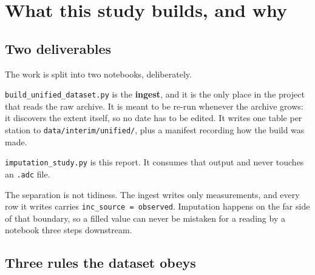 \documentclass[11pt,a4paper]{article}
\begin{document}
\tableofcontents

\section{What this study builds, and why}
\label{sec:intro}

\subsection{Two deliverables}

The work is split into two notebooks, deliberately.

\texttt{build\_unified\_dataset.py} is the \textbf{ingest}, and it is the only place
in the project that reads the raw archive. It is meant to be re-run whenever the
archive grows: it discovers the extent itself, so no date has to be edited. It
writes one table per station to \texttt{data/interim/unified/}, plus a manifest
recording how the build was made.

\texttt{imputation\_study.py} is this report. It consumes that output and never
touches an \texttt{.adc} file.

The separation is not tidiness. The ingest writes only measurements, and every
row it writes carries \texttt{inc\_source = observed}. Imputation happens on the
far side of that boundary, so a filled value can never be mistaken for a reading
by a notebook three steps downstream.

\subsection{Three rules the dataset obeys}

\end{document}
